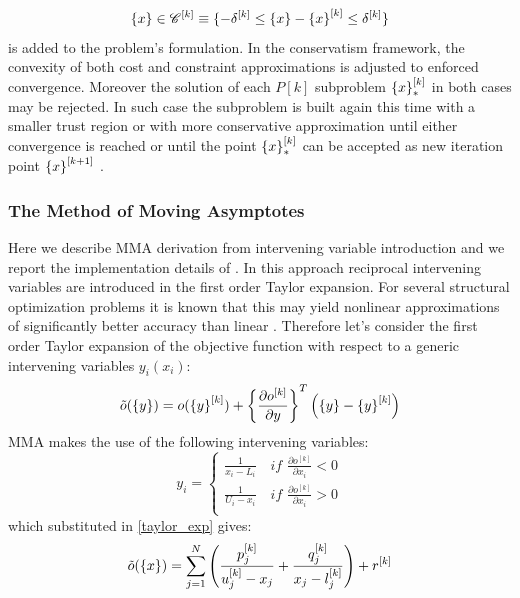 \begin{equation}
\left\lbrace{x}\right \rbrace\in \mathscr{C}^{[k]}\equiv \lbrace -\delta^{[k]} \leq \left\lbrace{x}\right \rbrace-\left\lbrace{x}\right \rbrace^{[k]}\leq \delta^{[k]} \rbrace
\end{equation}
is added to the problem's formulation.
In the conservatism framework, the convexity of both cost and constraint approximations is adjusted to enforced convergence. Moreover the solution of each $P[k]$ subproblem $\left\lbrace{x}\right \rbrace^{[k]}_*$ in both cases may be rejected. In such case the subproblem is built again this time with a smaller trust region or with more conservative approximation until either convergence is reached or until the point  $\left\lbrace{x}\right \rbrace^{[k]}_*$ can be accepted as new iteration point $\left\lbrace{x}\right \rbrace^{[k+1]}$ \cite{svanberg2002class}.
 \subsubsection{The Method of Moving Asymptotes}
 Here we describe MMA derivation from intervening variable introduction and we report the implementation details of \cite{svanberg2007mma}.
 In this approach reciprocal intervening variables are introduced in the first order Taylor expansion. For several structural optimization problems it is known that this may yield nonlinear approximations of significantly better accuracy than linear \cite{etman2012first}. Therefore let’s consider the first order Taylor expansion of the objective function with respect to a generic intervening variables $y_i(x_i)$:
 \begin{equation}
 \label{taylor_exp}
\tilde{o}(\left\lbrace{y}\right \rbrace)=o(\left\lbrace{y}\right \rbrace^{[k]})+\left\lbrace{\frac{\partial o^{[k]}}{\partial y}}\right \rbrace^T\left(\left\lbrace{y}\right \rbrace-\left\lbrace{y}\right \rbrace^{[k]}\right)
 \end{equation}
MMA makes the use of the following intervening variables:
\begin{equation}
y_i=
\begin{cases}
\frac{1}{x_i-L_i} \quad \textit{if } \frac{\partial o^{[k]}}{\partial x_i}<0\\
\frac{1}{U_i-x_i} \quad \textit{if } \frac{\partial o^{[k]}}{\partial x_i}>0\\
\end{cases}
\end{equation}
which substituted in \ref{taylor_exp} gives:
\begin{equation}
\tilde{o}(\left\lbrace{x}\right \rbrace)=\sum_{j=1}^N\left(\frac{p_j^{[k]}}{u_j^{[k]}-x_j}+\frac{q_j^{[k]}}{x_j-l_j^{[k]}}\right)+r^{[k]}
\end{equation}
